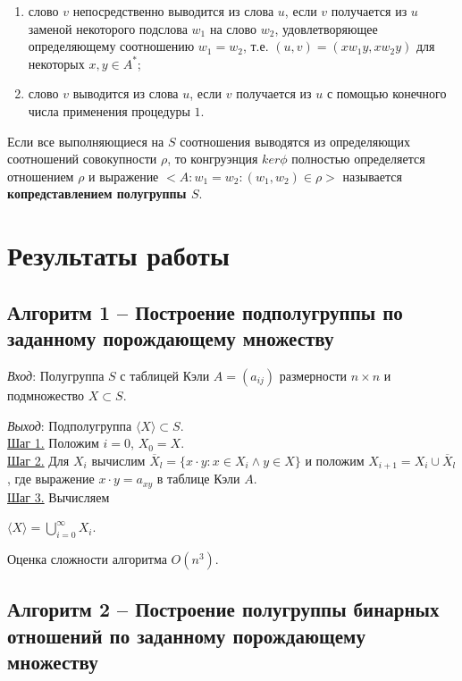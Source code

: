 \documentclass[bachelor, och, labwork]{shiza}
\begin{document}
    \begin{enumerate}
      \item слово $v$ непосредственно выводится из слова $u$, если $v$ получается из $u$ заменой некоторого подслова
      $w_1$ на слово $w_2$, удовлетворяющее определяющему соотношению $w_1 = w_2$, т.е. $(u, v) = (xw_1y, xw_2y)$ для
      некоторых $x, y \in A^*$;
      \item слово $v$ выводится из слова $u$, если $v$ получается из $u$ с помощью конечного числа применения процедуры
      $1$.
    \end{enumerate}
    
    Если все выполняющиеся на $S$ соотношения выводятся из определяющих соотношений совокупности $\rho$, то конгруэнция
    $ker\phi$ полностью определяется отношением $\rho$ и выражение $<A: {w_1 = w_2 : (w_1, w_2) \in \rho}>$ называется
    \textbf{копредставлением полугруппы $S$}.


\section{Результаты работы}
    \subsection{Алгоритм 1 -- Построение подполугруппы по заданному порождающему множеству}

    \textit{Вход}: Полугруппа $S$ с таблицей Кэли $A = (a_{ij})$ размерности $n \times n$ и подмножество $X \subset
    S$.

    \textit{Выход}: Подполугруппа $\langle X \rangle \subset S$.\\
    \underline{Шаг 1.} Положим $i = 0$, $X_0 = X$.\\
    \underline{Шаг 2.} Для $X_i$ вычислим $\overline{X}_l = \{x \cdot y : x \in X_i \wedge y \in X \}$ и положим $X_{i + 1} = X_i \cup \overline{X}_l$, где выражение $x \cdot y = a_{xy}$ в таблице Кэли $A$. \\
    \underline{Шаг 3.} Вычисляем 
    \begin{center} 
      $\langle X \rangle = \bigcup^\infty_{i = 0} X_i$.\\
    \end{center}
    Оценка сложности алгоритма $O(n^3)$.\\

    \subsection{Алгоритм 2 -- Построение полугруппы бинарных отношений по заданному порождающему множеству}
\end{document}
